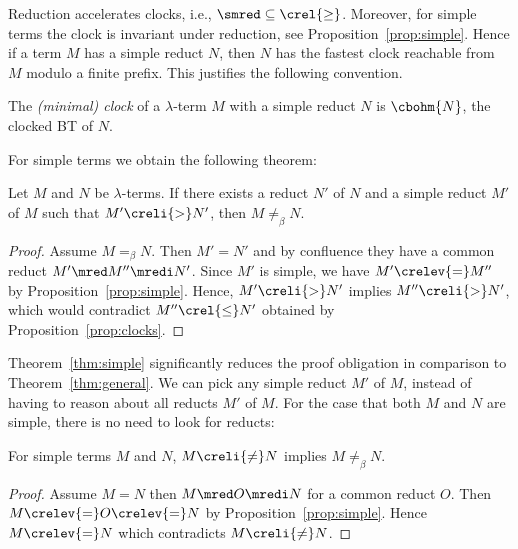 Reduction accelerates clocks, i.e., $\smred \subseteq {\crel{{\geq}}}$.
Moreover, for simple terms the clock is invariant under reduction, see Proposition~\ref{prop:simple}.
Hence if a term $M$ has a simple reduct $N$, then $N$ has the fastest clock reachable from $M$ 
modulo a finite prefix. This justifies the following convention.
\begin{convention}
  The \emph{(minimal) clock} of a $\lambda$-term $M$ with a simple reduct $N$
  is $\cbohm{N}$, the clocked BT of $N$.
\end{convention}


For simple terms we obtain the following theorem:
\begin{theorem}\label{thm:simple}
  Let $M$ and $N$ be $\lambda$-terms.
  If there exists a reduct $N'$ of $N$
  and a simple reduct $M'$ of $M$ such that
  $M' \creli{>} N'$, then $M \ne_\beta N$.
\end{theorem}
\begin{proof}
  Assume $M =_\beta N$. Then $M' = N'$ and by confluence they have a common reduct
  $M' \mred M'' \mredi N'$.
  Since $M'$ is simple, we have $M' \crelev{=} M''$ by Proposition~\ref{prop:simple}.
Hence, $M' \creli{>} N'$ implies $M'' \creli{>} N'$,
  which would contradict $M'' \crel{\le} N'$ obtained by Proposition~\ref{prop:clocks}.
\end{proof}
Theorem~\ref{thm:simple} significantly reduces 
the proof obligation in comparison to Theorem~\ref{thm:general}.
We can pick any simple reduct $M'$ of $M$,
instead of having to reason about all reducts $M'$ of $M$.
For the case that both $M$ and $N$ are simple, there is no need to look for reducts:
\begin{proposition}\label{cor:simple:simple}
  For simple terms $M$ and $N$,
  $M \creli{\ne} N$ implies $M \ne_\beta N$.
\end{proposition}
\begin{proof}
  Assume $M = N$ then $M \mred O \mredi N$ for a common reduct $O$.
  Then $M \crelev{=} O \crelev{=} N$ by Proposition~\ref{prop:simple}. 
  Hence $M \crelev{=} N$ which contradicts $M \creli{\ne} N$.
\end{proof}


